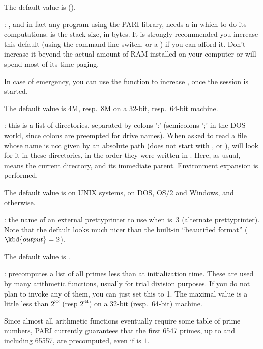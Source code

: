 The default value is  ().

: \label{se:def,parisize}, and in fact any program using the PARI
library, needs a  in which to do its computations. 
is the stack size, in bytes. It is strongly recommended you increase this
default (using the  command-line switch, or a ) if you can
afford it. Don't increase it beyond the actual amount of RAM installed on
your computer or  will spend most of its time paging.

In case of emergency, you can use the  function to
increase , once the session is started.

The default value is 4M, resp.~8M on a 32-bit, resp.~64-bit machine.

: \label{se:def,path}this is a list of directories, separated by colons ':'
(semicolons ';' in the DOS world, since colons are preempted for drive names).
When asked to read a file whose name is not given by an absolute path
(does not start with \kbd{/},  or ),  will look for
it in these directories, in the order they were written in . Here,
as usual,  means the current directory, and  its immediate
parent. Environment expansion is performed.

The default value is  on UNIX systems,
 on DOS, OS/2 and Windows, and  otherwise.

: \label{se:def,prettyprinter}the name of an external prettyprinter to use when
 is~3 (alternate prettyprinter). Note that the default
 looks much nicer than the built-in ``beautified
format'' ($\kbd{output} = 2$).

The default value is .

: \label{se:def,primelimit} precomputes a list of
all primes less than  at initialization time. These are used
by many arithmetic functions, usually for trial division purposes. If you do
not plan to invoke any of them, you can just set this to 1. The maximal value
is a little less than $2^{32}$ (resp $2^{64}$) on a 32-bit (resp.~64-bit)
machine.

Since almost all arithmetic functions eventually require some table of prime
numbers, PARI currently guarantees that the first 6547 primes, up to and
including 65557, are precomputed, even if  is $1$.

